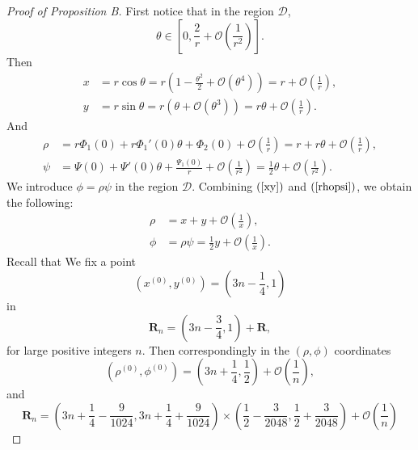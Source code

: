 \documentclass{article}
\numberwithin{figure}{section}
\numberwithin{equation}{section}
\theoremstyle{remark}
\theoremstyle{definition}
\begin{document}
    \begin{proof}[Proof of Proposition B]  
            First notice that in the region $\mathcal{D}$, $$\theta\in\left[0,\frac{2}{r}+\mathcal{O}\left(\frac{1}{r^2}\right)\right].$$
        Then
         \begin{equation}\label{xy}
        \begin{split}
        x&=r\cos\theta=r\left(1-\frac{\theta^2}{2}+\mathcal{O}\left(\theta^4\right)\right)=r+\mathcal{O}\left(\frac{1}{r}\right),\\
        y&=r\sin\theta=r\left(\theta+\mathcal{O}\left(\theta^3\right)\right)=r\theta+\mathcal{O}\left(\frac{1}{r}\right).
        \end{split}
        \end{equation}
        And
         \begin{equation}\label{rhopsi}
        \begin{split}
        \rho&=r\Phi_1(0)+r\Phi_1'(0)\theta+\Phi_2(0)+\mathcal{O}\left(\frac{1}{r}\right)=r+r\theta+\mathcal{O}\left(\frac{1}{r}\right),\\
        \psi&=\Psi(0)+\Psi'(0)\theta+\frac{\Psi_1(0)}{r}+\mathcal{O}\left(\frac{1}{r^2}\right)=\frac{1}{2}\theta+\mathcal{O}\left(\frac{1}{r^2}\right).
        \end{split}
        \end{equation}
        We introduce $\phi=\rho\psi$ in the region $\mathcal{D}$. Combining $(\ref{xy})$ and $(\ref{rhopsi})$, we obtain the following:
        \begin{equation}\label{xytorhophi}
        \begin{split}
        \rho&=x+y+\mathcal{O}\left(\frac{1}{x}\right),\\
        \phi&=\rho\psi=\frac{1}{2}y+\mathcal{O}\left(\frac{1}{x}\right).
        \end{split}
        \end{equation}
        Recall that We fix a point $$(x^{(0)},y^{(0)})=(3n-\frac{1}{4},1)$$ in
        $$\mathbf{R}_{n}=\left(3n-\frac{3}{4},1\right)+\mathbf{R},$$
        for large positive integers $n$. Then correspondingly in the $(\rho,\phi)$ coordinates
        $$(\rho^{(0)},\phi^{(0)})=(3n+\frac{1}{4},\frac{1}{2})+\mathcal{O}\left(\frac{1}{n}\right),$$ 
	and
	\begin{equation}\label{initialrhophi}
	    \mathbf{R}_n=\left(3n+\frac{1}{4}-\frac{9}{1024},3n+\frac{1}{4}+\frac{9}{1024}\right)\times\left(\frac{1}{2}-\frac{3}{2048},\frac{1}{2}+\frac{3}{2048}\right)+\mathcal{O}\left(\frac{1}{n}\right)
	\end{equation}
    

\end{proof}
\end{document}
